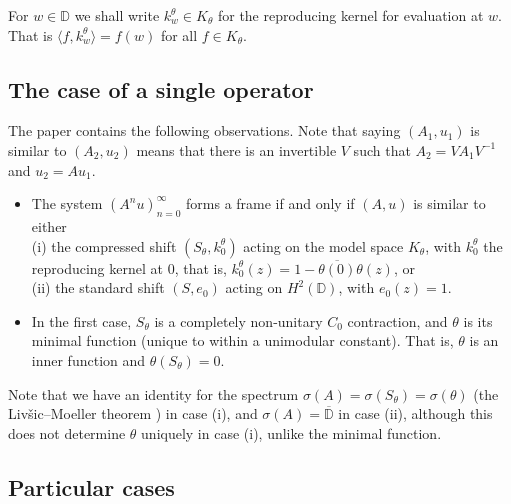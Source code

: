 \documentclass[11pt]{amsart}
\theoremstyle{definition}
\theoremstyle{remark}
\numberwithin{equation}{section}
\newcommand{\ol}{\overline}
\def\DD{{\mathbb D}}
\begin{document}
For $w \in \DD$ we shall write $k^\theta_w \in K_\theta$ for the reproducing kernel
for evaluation at $w$. That is $\langle f, k^\theta_w \rangle = f(w)$ for all $f \in K_\theta$.

\subsection{The case of a single operator}



The paper \cite{CHP20}
contains the following observations. Note that saying $(A_1,u_1)$ is similar to $(A_2,u_2)$ means that there is an invertible $V$
such that
$A_2=V A_1 V^{-1}$ and $u_2=A u_1$.

\begin{itemize}
\item The system $(A^n u)_{n =0}^\infty $ forms a frame if and only if $(A,u)$ is similar to
either\\ (i) the compressed shift
$(S_\theta, k_0^\theta)$ acting on the model space $K_\theta$,
with $k_0^\theta$ the reproducing kernel at $0$, that is, $k_0^\theta(z)=1-\ol{\theta(0)}\theta(z)$,
or\\ (ii) the standard shift   $(S, e_0)$ acting on $H^2(\DD)$, with $e_0(z)=1$.
\item In the first case, $S_\theta$ is a completely non-unitary $C_0$ contraction, and
$\theta$ is its minimal function (unique to within a unimodular constant). That is,
$\theta$ is an inner function and
$\theta(S_\theta)=0$.
\end{itemize}

Note that we have an identity for the spectrum $\sigma(A)=\sigma(S_\theta)=\sigma(\theta)$
(the Liv\v{s}ic--Moeller theorem \cite{nikolski-shift}) in case (i), and $\sigma(A)=\ol\DD$ in case (ii), although this does not
determine $\theta$ uniquely in case (i), unlike the minimal function.

\subsection{Particular cases}\label{subsec:pc}
\end{document}
